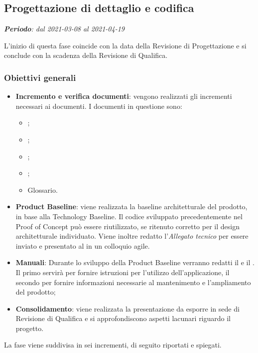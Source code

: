 \subsection{Progettazione di dettaglio e codifica}
\textit{\textbf{Periodo}: dal 2021-03-08 al 2021-04-19}

L'inizio di questa fase coincide con la data della Revisione di Progettazione e si conclude con la scadenza della Revisione di Qualifica.

\subsubsection{Obiettivi generali}

\begin{itemize}
\item \textbf{Incremento e verifica documenti}: vengono realizzati gli incrementi necessari ai documenti. I documenti in questione sono:
\begin{itemize}
\item \NdP{};
\item \AdR{};
\item \PdQ{};
\item \PdP{};
\item Glossario.
\end{itemize}
\item \textbf{Product Baseline}: viene realizzata la baseline architetturale del prodotto, in base alla Technology Baseline. Il codice sviluppato precedentemente nel Proof of Concept può essere riutilizzato, se ritenuto corretto per il design architetturale individuato. Viene inoltre redatto l'\textit{Allegato tecnico} per essere inviato e presentato al \CR{} in un colloquio agile.\\
\item \textbf{Manuali}: Durante lo sviluppo della Product Baseline verranno redatti il \MU{} e il \MM. Il primo servirà per fornire istruzioni per l'utilizzo dell'applicazione, il secondo per fornire informazioni necessarie al mantenimento e l'ampliamento del prodotto;
\item \textbf{Consolidamento}: viene realizzata la presentazione da esporre in sede di Revisione di Qualifica e si approfondiscono aspetti lacunari riguardo il progetto.
\end{itemize}

La fase viene suddivisa in sei incrementi, di seguito riportati e spiegati.









